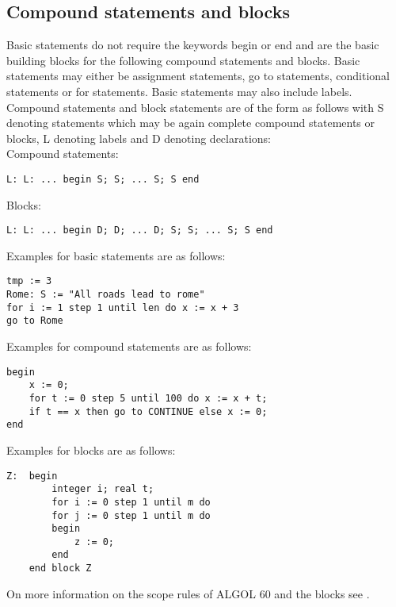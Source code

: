 \documentclass{article}
\begin{document}
\subsection{Compound statements and blocks}
Basic statements do not require the keywords begin or end and are the basic building blocks for the following compound statements and blocks. Basic statements may either be assignment statements, go to statements, conditional statements or for statements. Basic statements may also include labels.\\

Compound statements and block statements are of the form as follows with S denoting statements which may be again complete compound statements or blocks, L denoting labels and D denoting declarations:\\

Compound statements:
\begin{lstlisting}[language={[60]algol}]
L: L: ... begin S; S; ... S; S end
\end{lstlisting}

Blocks:
\begin{lstlisting}[language={[60]algol}]
L: L: ... begin D; D; ... D; S; S; ... S; S end
\end{lstlisting}

Examples for basic statements are as follows:\\ 
\begin{lstlisting}[language={[60]algol}]
tmp := 3
Rome: S := "All roads lead to rome"
for i := 1 step 1 until len do x := x + 3
go to Rome
\end{lstlisting}

Examples for compound statements are as follows:\\
\begin{lstlisting}[language={[60]algol}]
begin
    x := 0;
    for t := 0 step 5 until 100 do x := x + t;
    if t == x then go to CONTINUE else x := 0;
end
\end{lstlisting}

Examples for blocks are as follows:\\ 
\begin{lstlisting}[language={[60]algol}]
Z:  begin 
        integer i; real t;
        for i := 0 step 1 until m do
        for j := 0 step 1 until m do
        begin
            z := 0;
        end
    end block Z
\end{lstlisting}

On more information on the scope rules of ALGOL 60 and the blocks see .
\end{document}
